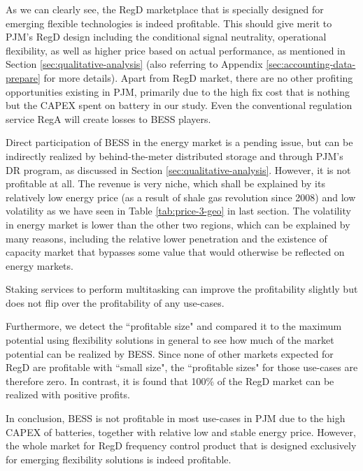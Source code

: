 As we can clearly see, the RegD marketplace that is specially designed for emerging flexible technologies is indeed profitable. This should give merit to PJM's RegD design including the conditional signal neutrality, operational flexibility, as well as higher price based on actual performance, as mentioned in Section \ref{sec:qualitative-analysis} (also referring to Appendix \ref{sec:accounting-data-prepare} for more details). Apart from RegD market, there are no other profiting opportunities existing in PJM, primarily due to the high fix cost that is nothing but the CAPEX spent on battery in our study. Even the conventional regulation service RegA will create losses to BESS players.

Direct participation of BESS in the energy market is a pending issue, but can be indirectly realized by behind-the-meter distributed storage and through PJM's DR program, as discussed in Section \ref{sec:qualitative-analysis}. However, it is not profitable at all. The revenue is very niche, which shall be explained by its relatively low energy price (as a result of shale gas revolution since 2008) and low volatility as we have seen in Table \ref{tab:price-3-geo} in last section. The volatility in energy market is lower than the other two regions, which can be explained by many reasons, including the relative lower penetration and the existence of capacity market that bypasses some value that would otherwise be reflected on energy markets.

Staking services to perform multitasking can improve the profitability slightly but does not flip over the profitability of any use-cases. 

Furthermore, we detect the ``profitable size" and compared it to the maximum potential using flexibility solutions in general to see how much of the market potential can be realized by BESS. Since none of other markets expected for RegD are profitable with ``small size", the ``profitable sizes" for those use-cases are therefore zero. In contrast, it is found that 100\% of the RegD market can be realized with positive profits.

In conclusion, BESS is not profitable in most use-cases in PJM due to the high CAPEX of batteries, together with relative low and stable energy price. However, the whole market for RegD frequency control product that is designed exclusively for emerging flexibility solutions is indeed profitable. 

